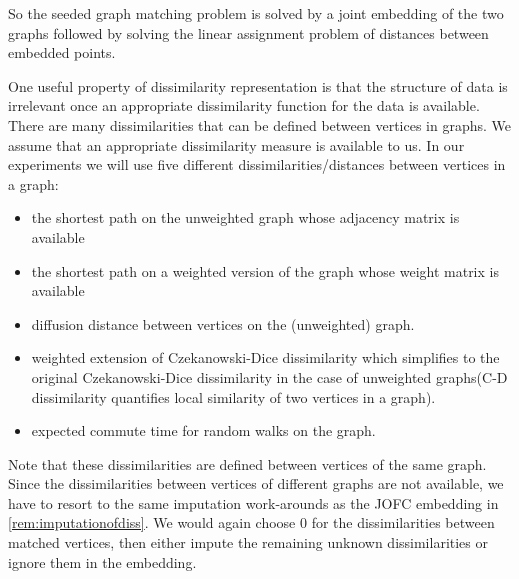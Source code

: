 \documentclass[12pt,oneside,final]{thesis}\usepackage[]{graphicx}\usepackage[]{color}
\begin{document}
So the seeded graph matching problem is solved by a joint embedding of the two graphs followed by solving the linear assignment problem of distances between embedded points.
 
One useful property of dissimilarity representation is that the structure of data is irrelevant once an appropriate dissimilarity function  for the data is available. 
There are many dissimilarities that can be defined between vertices in graphs. We assume that an appropriate dissimilarity measure is available to us.
In our experiments we will use five different dissimilarities/distances between vertices in a graph:
\begin{itemize}
 \item the shortest path on the  unweighted graph whose adjacency matrix is available
 \item the shortest path on a weighted version of the graph whose weight matrix is available
 \item diffusion distance between vertices on the (unweighted) graph.
 \item weighted extension of Czekanowski-Dice dissimilarity\cite{DICE,weightedDICE} which simplifies to the original Czekanowski-Dice dissimilarity in the case of unweighted graphs(C-D dissimilarity  quantifies local similarity of two vertices in a graph).
 \item expected commute time for random walks on the graph.
 \end{itemize}
 \begin{remark}
 Note that these dissimilarities are defined between vertices of the same graph. Since the dissimilarities between vertices of different graphs are not available, we have to resort to the same imputation work-arounds  as the JOFC embedding in  \ref{rem:imputationofdiss}.
 We would again choose 0 for the dissimilarities between matched vertices, then either impute the remaining unknown dissimilarities or ignore them in the embedding.
 \end{remark}
 
\end{document}

